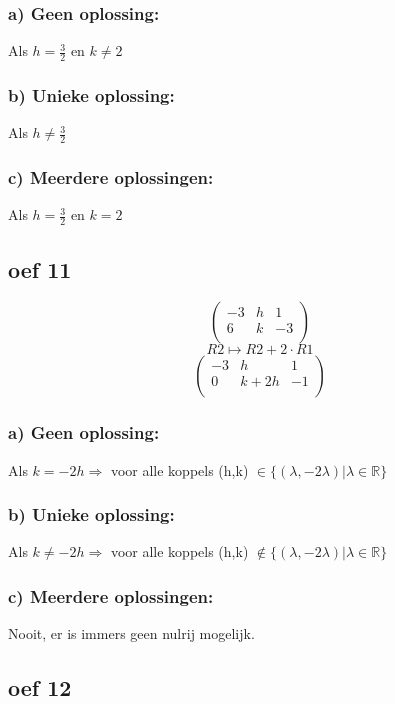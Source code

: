 \documentclass[lineaire_algebra_oplossingen.tex]{subfiles}
\begin{document}
\subsubsection*{a) Geen oplossing:}
Als $h = \frac{3}{2}$ en $k \neq 2$
\subsubsection*{b) Unieke oplossing:}
Als $h \neq \frac{3}{2}$
\subsubsection*{c) Meerdere oplossingen:}
Als $h = \frac{3}{2}$ en $k = 2$
\subsection{oef 11}
\[
\begin{pmatrix}
-3 &  h &  1\\
6 &  k &  -3\\
\end{pmatrix}
\]
\[R2 \longmapsto R2 + 2\cdot R1\]
\[
\begin{pmatrix}
-3 &  h &  1\\
0 &  k+2h &  -1\\
\end{pmatrix}
\]
\subsubsection*{a) Geen oplossing:}
Als $k = -2h \Rightarrow$ voor alle koppels (h,k) $\in \{(\lambda, -2\lambda)| \lambda \in \mathbb{R}\}$
\subsubsection*{b) Unieke oplossing:}
Als $k \neq -2h \Rightarrow$ voor alle koppels (h,k) $\not \in \{(\lambda, -2\lambda)| \lambda \in \mathbb{R}\}$
\subsubsection*{c) Meerdere oplossingen:}
Nooit, er is immers geen nulrij mogelijk.

\subsection{oef 12}
\end{document}
